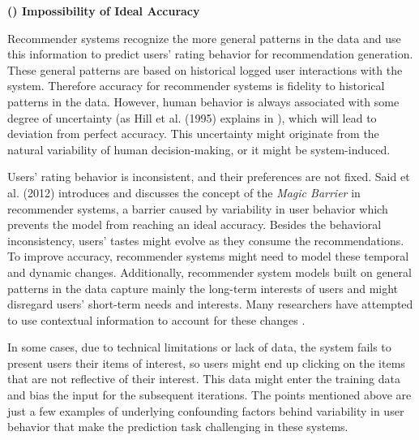 \vspace{0.25cm}
\noindent \textbf{() Impossibility of Ideal Accuracy}
\vspace{0.25cm}

Recommender systems recognize the more general patterns in the data and use this information to predict users' rating behavior for recommendation generation. These general patterns are based on historical logged user interactions with the system. Therefore accuracy for recommender systems is fidelity to historical patterns in the data. However, human behavior is always associated with some degree of uncertainty (as Hill et al. (1995) explains in \cite{hill1995recommending}), which will lead to deviation from perfect accuracy. This uncertainty might originate from the natural variability of human decision-making, or it might be system-induced.


Users' rating behavior is inconsistent, and their preferences are not fixed. Said et al. (2012) \cite{Said2012MagicBarrier} introduces and discusses the concept of the \textit{Magic Barrier} in recommender systems, a barrier caused by variability in user behavior which prevents the model from reaching an ideal accuracy. Besides the behavioral inconsistency, users' tastes might evolve \cite{McAuley2013expertise} as they consume the recommendations. To improve accuracy, recommender systems might need to model these temporal and dynamic changes. Additionally, recommender system models built on general patterns in the data capture mainly the long-term interests of users and might disregard users' short-term needs and interests. Many researchers have attempted to use contextual information to account for these changes \cite{Adomavicius2011context}.

In some cases, due to technical limitations or lack of data, the system fails to present users their items of interest, so users might end up clicking on the items that are not reflective of their interest. This data might enter the training data and bias the input for the subsequent iterations. The points mentioned above are just a few examples of underlying confounding factors behind variability in user behavior that make the prediction task challenging in these systems.

